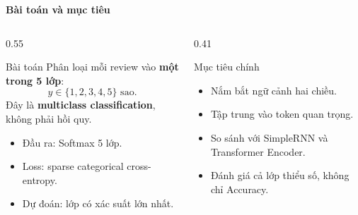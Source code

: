 \documentclass[aspectratio=169]{beamer}
\begin{document}
\begin{frame}{\textbf{\large Bài toán và mục tiêu}}
    \begin{columns}[T,onlytextwidth]
        \begin{column}{0.55\textwidth}
            \begin{block}{Bài toán}
                Phân loại mỗi review vào \textbf{một trong 5 lớp}:
                \[
                    y\in\{1,2,3,4,5\}\text{ sao}.
                \]
                Đây là \textbf{multiclass classification}, không phải hồi quy.
            \end{block}

            \begin{itemize}
                \item Đầu ra: Softmax 5 lớp.
                \item Loss: sparse categorical cross-entropy.
                \item Dự đoán: lớp có xác suất lớn nhất.
            \end{itemize}
        \end{column}

        \begin{column}{0.41\textwidth}
            \begin{alertblock}{Mục tiêu chính}
                \begin{itemize}
                    \item Nắm bắt ngữ cảnh hai chiều.
                    \item Tập trung vào token quan trọng.
                    \item So sánh với SimpleRNN và Transformer Encoder.
                    \item Đánh giá cả lớp thiểu số, không chỉ Accuracy.
                \end{itemize}
            \end{alertblock}
        \end{column}
    \end{columns}
\end{frame}
\end{document}
